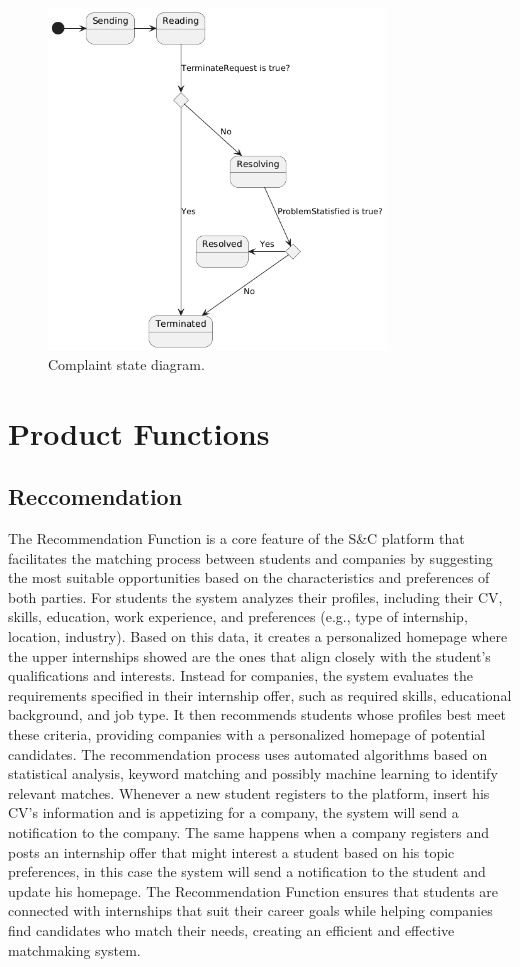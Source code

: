 \begin{figure}[H]
        \centering
        \includegraphics[width=0.8\textwidth]{Assets/Statecharts/Complain_SC.png}
        \caption{Complaint state diagram.}
        \label{fig:Complaint state diagram.}
    \end{figure}
\section{Product Functions}
\subsection{Reccomendation}
The Recommendation Function is a core feature of the S\&C platform that facilitates the matching process between students and companies by suggesting the most suitable opportunities based on the characteristics and preferences of both parties. 
For students the system analyzes their profiles, including their CV, skills, education, work experience, and preferences (e.g., type of internship, location, industry). Based on this data, it creates a personalized homepage where the upper internships showed are the ones that align closely with the student's qualifications and interests.
Instead for companies, the system evaluates the requirements specified in their internship offer, such as required skills, educational background, and job type. It then recommends students whose profiles best meet these criteria, providing companies with a personalized homepage of potential candidates.
The recommendation process uses automated algorithms based on statistical analysis, keyword matching and possibly machine learning to identify relevant matches. Whenever a new student registers to the platform, insert his CV's information and is appetizing for a company, the system will send a notification to the company. The same happens when a company registers and posts an internship offer that might interest a student based on his topic preferences, in this case the system will send a notification to the student and update his homepage. The Recommendation Function ensures that students are connected with internships that suit their career goals while helping companies find candidates who match their needs, creating an efficient and effective matchmaking system.
